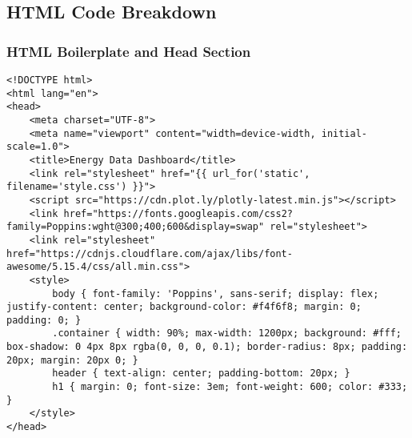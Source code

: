 


\subsection{HTML Code Breakdown}

\subsubsection{HTML Boilerplate and Head Section}
\begin{lstlisting}[style=HTML, caption={HTML Boilerplate and Head Section}]
<!DOCTYPE html>
<html lang="en">
<head>
    <meta charset="UTF-8">
    <meta name="viewport" content="width=device-width, initial-scale=1.0">
    <title>Energy Data Dashboard</title>
    <link rel="stylesheet" href="{{ url_for('static', filename='style.css') }}">
    <script src="https://cdn.plot.ly/plotly-latest.min.js"></script>
    <link href="https://fonts.googleapis.com/css2?family=Poppins:wght@300;400;600&display=swap" rel="stylesheet">
    <link rel="stylesheet" href="https://cdnjs.cloudflare.com/ajax/libs/font-awesome/5.15.4/css/all.min.css">
    <style>
        body { font-family: 'Poppins', sans-serif; display: flex; justify-content: center; background-color: #f4f6f8; margin: 0; padding: 0; }
        .container { width: 90%; max-width: 1200px; background: #fff; box-shadow: 0 4px 8px rgba(0, 0, 0, 0.1); border-radius: 8px; padding: 20px; margin: 20px 0; }
        header { text-align: center; padding-bottom: 20px; }
        h1 { margin: 0; font-size: 3em; font-weight: 600; color: #333; }
    </style>
</head>
\end{lstlisting}


